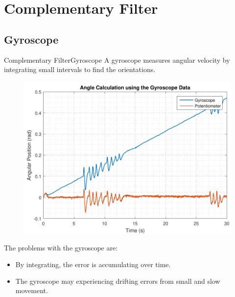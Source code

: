 \section{Complementary Filter}

\subsection{Gyroscope}
\begin{frame}{Complementary Filter}{Gyroscope}
A gyroscope measures angular velocity by integrating small intervals to find the orientations.
\begin{figure}
	\centering
	\includegraphics[scale=0.4]{Pictures/angleGyro.pdf}
\end{figure}

The problems with the gyroscope are:
	\begin{itemize}
		\item {By integrating, the error is accumulating over time.}
		\item {The gyroscope may experiencing drifting errors from small and slow movement.}
	\end{itemize}
\end{frame}
